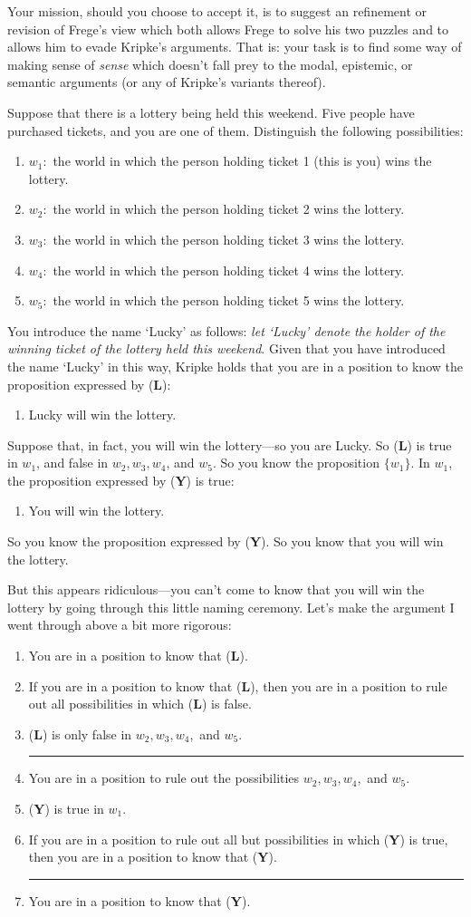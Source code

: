 \documentclass[12pt]{article}
\newcommand{\qee}{\begin{enumerate}[align=left,style=nextline,leftmargin=17pt,labelsep=5pt,font=\normalfont, topsep=10pt]}
\newcommand{\ze}{\end{enumerate}}
\newcommand{\p}{\item}
\newcommand{\e}{\emph}
\newcommand{\tbf}{\textbf}
\newcommand{\thus}{

\vspace{5pt}\hrule

}
\begin{document}
	Your mission, should you choose to accept it, is to suggest an refinement or revision of Frege's view which both allows Frege to solve his two puzzles and to allows him to evade Kripke's arguments.  That is: your task is to find some way of making sense of \e{sense} which doesn't fall prey to the modal, epistemic, or semantic arguments (or any of Kripke's variants thereof).
	
	\p  Suppose that there is a lottery being held this weekend.  Five people have purchased tickets, and you are one of them.  Distinguish the following possibilities:
		\qee
		\p[-] $w_1 :$ the world in which the person holding ticket 1 (this is you) wins the lottery.
		\p[-] $w_2 :$ the world in which the person holding ticket 2 wins the lottery.
		\p[-] $w_3 :$ the world in which the person holding ticket 3 wins the lottery.
		\p[-] $w_4 :$ the world in which the person holding ticket 4 wins the lottery.
		\p[-] $w_{5} :$ the world in which the person holding ticket 5 wins the lottery.
		\ze 
	
	You introduce the name `Lucky' as follows: \e{let `Lucky' denote the holder of the winning ticket of the lottery held this weekend}.  Given that you have introduced the name `Lucky' in this way, Kripke holds that you are in a position to know the proposition expressed by (\tbf{L}):
			\qee
			\p[(\tbf{L})] Lucky will win the lottery.
			\ze 
	Suppose that, in fact, you will win the lottery---so you are Lucky.  So (\tbf{L}) is true in $w_1$, and false in $w_2, w_3, w_4$, and $w_5$.    So you know the proposition $\{ w_1 \}$.  In $w_1$, the proposition expressed by (\tbf{Y}) is true:
			\qee
			\p[(\tbf{Y})] You will win the lottery.
			\ze 
So you know the proposition expressed by (\tbf{Y}).  So you know that you will win the lottery.

But this appears ridiculous---you can't come to know that you will win the lottery by going through this little naming ceremony.  Let's make the argument I went through above a bit more rigorous:
	\begin{center}
	\begin{minipage}{340pt}
	\begin{enumerate}
	\p[P1.] You are in a position to know that (\tbf{L}).
	\p[P2.] If you are in a position to know that (\tbf{L}), then you are in a position to rule out all possibilities in which (\tbf{L}) is false.
	\p[P3.] (\tbf{L}) is only false in $w_2, w_3, w_4,$ and $w_5$.
	\thus 
	\p[C1.] You are in a position to rule out the possibilities $w_2, w_3, w_4,$ and $w_5$.
	\p[P4.] (\tbf{Y}) is true in $w_1$.
	\p[P5.] If you are in a position to rule out all but possibilities in which (\tbf{Y}) is true, then you are in a position to know that (\tbf{Y}).
	\thus
	\p[C2.] You are in a position to know that (\tbf{Y}).
	\end{enumerate}
	\end{minipage}
	\end{center}
\end{document}

